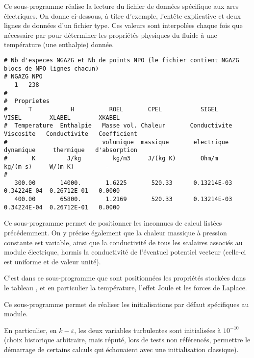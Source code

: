 
Ce sous-programme r\'ealise la lecture du fichier de donn\'ees sp\'ecifique
aux arcs \'electriques. On donne ci-dessous, \`a titre d'exemple, l'ent\^ete
explicative et deux lignes de donn\'ees d'un fichier type. Ces valeurs sont interpol\'ees chaque
fois que n\'ecessaire par  pour d\'eterminer les propri\'et\'es
physiques du fluide \`a une temp\'erature (une enthalpie) donn\'ee.

{\scriptsize
\begin{verbatim}
# Nb d'especes NGAZG et Nb de points NPO (le fichier contient NGAZG blocs de NPO lignes chacun)
# NGAZG NPO
   1   238
#
#  Proprietes
#      T           H          ROEL       CPEL           SIGEL        VISEL        XLABEL        XKABEL
#  Temperature  Enthalpie   Masse vol. Chaleur       Conductivite  Viscosite   Conductivite   Coefficient
#                           volumique  massique       electrique   dynamique     thermique   d'absorption
#       K         J/kg         kg/m3     J/(kg K)       Ohm/m        kg/(m s)     W/(m K)         -
#
   300.00       14000.       1.6225       520.33      0.13214E-03  0.34224E-04  0.26712E-01   0.0000
   400.00       65800.       1.2169       520.33      0.13214E-03  0.34224E-04  0.26712E-01   0.0000
\end{verbatim}
}



Ce sous-programme permet de positionner les inconnues de calcul list\'ees
pr\'ec\'edemment. On y pr\'ecise \'egalement que la chaleur massique \`a
pression constante est variable, ainsi que la conductivit\'e de tous les
scalaires associ\'es au module \'electrique, hormis la conductivit\'e de
l'\'eventuel potentiel vecteur (celle-ci est uniforme et de valeur unit\'e).



C'est dans ce sous-programme que sont positionn\'ees les propri\'et\'es stock\'ees
dans le tableau , et en particulier la temp\'erature, l'effet Joule
et les forces de Laplace.


Ce sous-programme permet de r\'ealiser les initialisations par d\'efaut
sp\'ecifiques au module.

En particulier, en $k-\varepsilon$, les deux variables
turbulentes sont initialis\'ees \`a $10^{-10}$ (choix historique arbitraire,
mais r\'eput\'e, lors de tests non r\'ef\'erenc\'es, permettre le d\'emarrage de
certains calculs qui \'echouaient avec une initialisation classique).

